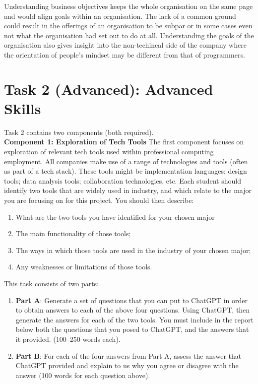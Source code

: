 \documentclass[a4paper, 11pt]{report}
\begin{document}
{Understanding business objectives keeps the whole organisation on the same page and would align goals within an organisation. The lack of a common ground could result in the offerings of an organisation to be subpar or in some cases even not what the organisation had set out to do at all. Understanding the goals of the organisation also gives insight into the non-techincal side of the company where the orientation of people's mindset may be different from that of programmers.
\newpage
\section{Task 2 (Advanced): Advanced Skills}
Task 2 contains two components (both required).\\[2mm]
\textbf{Component 1: Exploration of Tech Tools}
The first component focuses on exploration of relevant tech tools used within professional computing employment. All companies make use of a range of technologies and tools (often as part of a tech stack). These tools might be implementation languages; design tools; data analysis tools; collaboration technologies, etc. Each student should identify two tools that are widely used in industry, and which relate to the major you are focusing on for this project. You should then describe:
\begin{enumerate}
\item What are the two tools you have identified for your chosen major
\item The main functionality of those tools;
\item The ways in which those tools are used in the industry of your chosen major;
\item Any weaknesses or limitations of those tools.
\end{enumerate}
This task consists of two parts:
\begin{enumerate}
\item \textbf{Part A}: Generate a set of questions that you can put to ChatGPT in order to obtain answers to each of the above four questions. Using ChatGPT, then generate the answers for each of the two tools. You must include in the report below both the questions that you posed to ChatGPT, and the answers that it provided.  (100–250 words each).
\item \textbf{Part B}: For each of the four answers from Part A, assess the answer that ChatGPT provided and explain to us why you agree or disagree with the answer (100 words for each question above).

\end{enumerate}}
\end{document}
